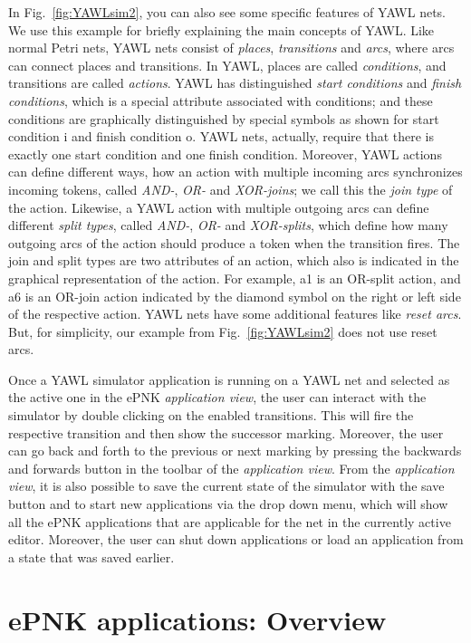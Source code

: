 \documentclass[a4paper]{llncs}
\begin{document}
In Fig.~\ref{fig:YAWLsim2}, you can also see some specific features of YAWL nets.
We use this example for briefly explaining the main concepts of YAWL.
Like normal Petri nets, YAWL nets consist of \emph{places}, \emph{transitions} and
\emph{arcs}, where arcs can connect places and transitions. In YAWL, places
are called \emph{conditions}, and transitions are called \emph{actions}. YAWL
has distinguished \emph{start conditions} and  \emph{finish conditions},
which is a special attribute associated with conditions; and these conditions
are graphically distinguished by special symbols as shown for start condition
{\sf i} and finish condition {\sf o}. YAWL nets, actually, require that there
is exactly one start condition and one finish condition. Moreover, YAWL actions
can define different ways, how an action with multiple incoming arcs synchronizes
incoming tokens, called \emph{AND-}, \emph{OR-} and \emph{XOR-joins}; we call
this the \emph{join type} of the action. Likewise, a YAWL action with
multiple outgoing arcs can define different \emph{split types}, called
\emph{AND-}, \emph{OR-} and \emph{XOR-splits}, which define
how many outgoing arcs of the action should produce a token when the transition fires.
The join and split types are two attributes of an action, which also is
indicated in the graphical representation of the action. For example,
{\sf a1} is an OR-split action, and {\sf a6} is an OR-join action indicated
by the diamond symbol on the right or left side of the respective action.
YAWL nets have some additional features like \emph{reset arcs}.
But, for simplicity, our example from Fig.~\ref{fig:YAWLsim2} does not
use reset arcs.

Once a YAWL simulator application is running on a YAWL net and selected as
the active one in the ePNK \emph{application view}, the user can interact with
the simulator by double clicking on the enabled transitions. This will fire
the respective transition and then show the successor marking.
Moreover, the user can go back and forth to the previous or next marking by pressing
the backwards and forwards button in the toolbar of the \emph{application view}.
From the \emph{application view}, it is also possible to save the current state of the simulator
with the save button and to start new applications via the drop down menu, which will
show all the ePNK applications that are applicable for the net in the currently active
editor. Moreover, the user can shut down applications or load an application
from a state that was saved earlier.

\section{ePNK applications: Overview}
\label{sec:overview}
\end{document}
